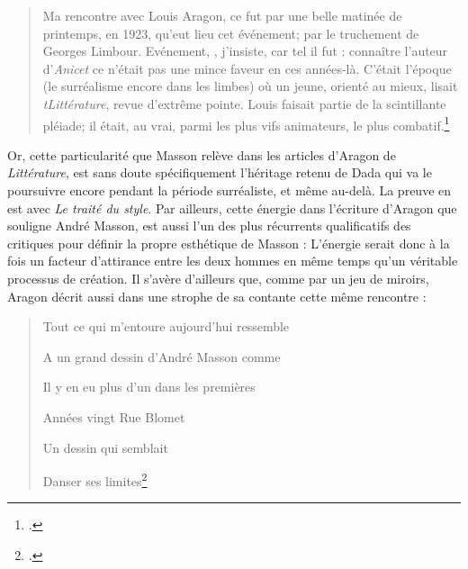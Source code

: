 \begin{quote} Ma rencontre avec Louis Aragon, ce fut par une belle matinée de printemps, en 1923, qu’eut lieu cet événement; par le truchement de Georges Limbour. Evénement, , j’insiste, car tel il fut : connaître l’auteur d’\emph{Anicet} ce n’était pas une mince faveur en ces années-là. C’était l’époque (le surréalisme encore dans les limbes) où un jeune, orienté au mieux, lisait \emph{tLittérature}, revue d’extrême pointe. Louis faisait partie de la scintillante pléiade; il était, au vrai, parmi les plus vifs animateurs, le plus combatif.\footcite[p84]{rebelle}\end{quote}

	Or, cette particularité que Masson relève dans les articles d’Aragon de \emph{Littérature}, est sans doute spécifiquement l’héritage retenu de Dada qui va le poursuivre encore pendant la période surréaliste, et même au-delà. La preuve en est avec \emph{Le traité du style}. Par ailleurs, cette énergie dans l’écriture d’Aragon que souligne André Masson, est aussi l’un des plus récurrents qualificatifs des critiques pour définir la propre esthétique de Masson : L’énergie serait donc à la fois un facteur d’attirance entre les deux hommes en même temps qu’un véritable processus de création. Il s’avère d’ailleurs que, comme par un jeu de miroirs, Aragon décrit aussi dans une strophe de sa contante cette même rencontre :

    
\begin{verse}    
Tout ce qui m’entoure aujourd’hui ressemble

A un grand dessin d’André Masson comme

Il y en eu plus d’un dans les premières

Années vingt Rue Blomet 

Un dessin qui semblait

Danser ses limites\footcite[p. 682]{ecritssurla} 
\end{verse}

